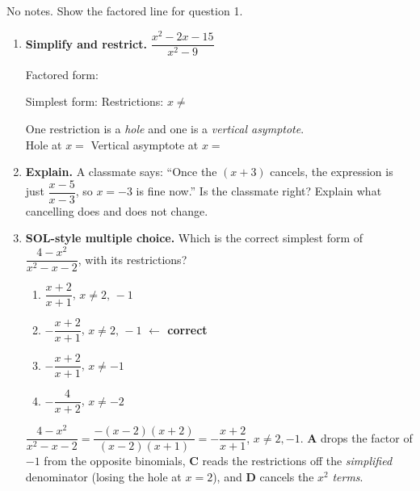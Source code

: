 \documentclass[10pt]{article}
\begin{document}
\namedateperiod

\vspace{0.08in}

No notes. Show the factored line for question 1.

\vspace{0.06in}

\begin{enumerate}[leftmargin=1.8em, itemsep=9pt]
  \item \textbf{Simplify and restrict.} \; $\dfrac{x^2-2x-15}{x^2-9}$

        \vspace{4pt}
        Factored form: 

        \vspace{4pt}
        Simplest form:  \quad Restrictions: $x\neq$ 

        \vspace{4pt}
        One restriction is a \emph{hole} and one is a \emph{vertical asymptote}. \\[3pt]
        Hole at $x=$  \quad Vertical asymptote at $x=$ 

  \item \textbf{Explain.} A classmate says: ``Once the $(x+3)$ cancels, the expression is just
        $\dfrac{x-5}{x-3}$, so $x=-3$ is fine now.'' Is the classmate right? Explain what cancelling
        does and does not change.

  \item \textbf{SOL-style multiple choice.} Which is the correct simplest form of
        $\dfrac{4-x^2}{x^2-x-2}$, with its restrictions?
        \begin{enumerate}[label=\Alph*., leftmargin=1.9em, itemsep=1pt]
          \item $\dfrac{x+2}{x+1}$, \; $x\neq2,\,-1$
          \item $-\dfrac{x+2}{x+1}$, \; $x\neq2,\,-1$
                \quad \textcolor{keyred}{\textbf{$\leftarrow$ correct}}
          \item $-\dfrac{x+2}{x+1}$, \; $x\neq-1$
          \item $-\dfrac{4}{x+2}$, \; $x\neq-2$
        \end{enumerate}
        \vspace{2pt}
        {\small $\dfrac{4-x^2}{x^2-x-2}=\dfrac{-(x-2)(x+2)}{(x-2)(x+1)}=-\dfrac{x+2}{x+1}$, $x\neq2,-1$.
        \textbf{A} drops the factor of $-1$ from the opposite binomials, \textbf{C} reads the
        restrictions off the \emph{simplified} denominator (losing the hole at $x=2$), and \textbf{D}
        cancels the $x^2$ \emph{terms}.}
\end{enumerate}
\end{document}
